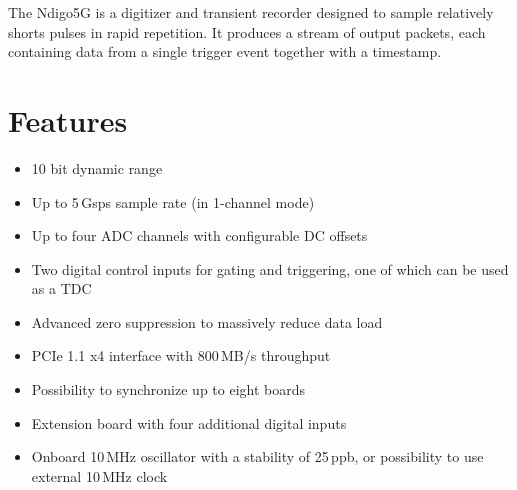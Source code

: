The Ndigo5G is a digitizer and transient recorder designed to sample relatively shorts pulses in rapid repetition. It produces a stream of output packets, each containing data from a single trigger event together with a timestamp.
\section{Features}
    \begin{itemize}
        \item 10 bit dynamic range
        \item Up to 5\,Gsps sample rate (in 1-channel mode)
        \item Up to four ADC channels with configurable DC offsets
        \item Two digital control inputs for gating and triggering, one of
              which can be used as a TDC
        \item Advanced zero suppression to massively reduce data load
        \item PCIe 1.1 x4 interface with 800\,MB/s throughput
        \item Possibility to synchronize up to eight boards
        \item Extension board with four additional digital inputs
        \item Onboard 10\,MHz oscillator with a stability of 25\,ppb, or
              possibility to use external 10\,MHz clock
    \end{itemize}